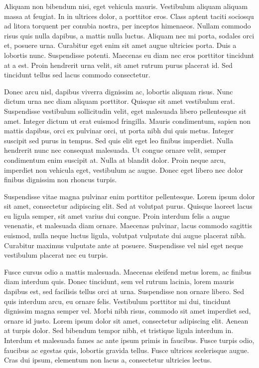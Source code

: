Aliquam non bibendum nisi, eget vehicula mauris. Vestibulum aliquam aliquam massa at feugiat. In in ultrices dolor, a porttitor eros. Class aptent taciti sociosqu ad litora torquent per conubia nostra, per inceptos himenaeos. Nullam commodo risus quis nulla dapibus, a mattis nulla luctus. Aliquam nec mi porta, sodales orci et, posuere urna. Curabitur eget enim sit amet augue ultricies porta. Duis a lobortis nunc. Suspendisse potenti. Maecenas eu diam nec eros porttitor tincidunt at a est. Proin hendrerit urna velit, sit amet rutrum purus placerat id. Sed tincidunt tellus sed lacus commodo consectetur.

Donec arcu nisl, dapibus viverra dignissim ac, lobortis aliquam risus. Nunc dictum urna nec diam aliquam porttitor. Quisque sit amet vestibulum erat. Suspendisse vestibulum sollicitudin velit, eget malesuada libero pellentesque sit amet. Integer dictum ut erat euismod fringilla. Mauris condimentum, sapien non mattis dapibus, orci ex pulvinar orci, ut porta nibh dui quis metus. Integer suscipit sed purus in tempus. Sed quis elit eget leo finibus imperdiet. Nulla hendrerit nunc nec consequat malesuada. Ut congue ornare velit, semper condimentum enim suscipit at. Nulla at blandit dolor. Proin neque arcu, imperdiet non vehicula eget, vestibulum ac augue. Donec eget libero nec dolor finibus dignissim non rhoncus turpis.

Suspendisse vitae magna pulvinar enim porttitor pellentesque. Lorem ipsum dolor sit amet, consectetur adipiscing elit. Sed at volutpat purus. Quisque laoreet lacus eu ligula semper, sit amet varius dui congue. Proin interdum felis a augue venenatis, et malesuada diam ornare. Maecenas pulvinar, lacus commodo sagittis euismod, nulla neque luctus ligula, volutpat vulputate dui augue placerat nibh. Curabitur maximus vulputate ante at posuere. Suspendisse vel nisl eget neque vestibulum placerat nec eu turpis.

Fusce cursus odio a mattis malesuada. Maecenas eleifend metus lorem, ac finibus diam interdum quis. Donec tincidunt, sem vel rutrum lacinia, lorem mauris dapibus est, sed facilisis tellus orci at urna. Suspendisse non ornare libero. Sed quis interdum arcu, eu ornare felis. Vestibulum porttitor mi dui, tincidunt dignissim magna semper vel. Morbi nibh risus, commodo sit amet imperdiet sed, ornare id justo. Lorem ipsum dolor sit amet, consectetur adipiscing elit. Aenean at turpis dolor. Sed bibendum tempor nibh, et tristique ligula interdum in. Interdum et malesuada fames ac ante ipsum primis in faucibus. Fusce turpis odio, faucibus ac egestas quis, lobortis gravida tellus. Fusce ultrices scelerisque augue. Cras dui ipsum, elementum non lacus a, consectetur ultricies lectus.

